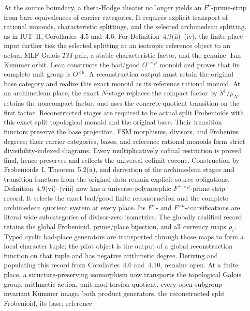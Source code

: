 \documentclass[11pt]{article}
\theoremstyle{plain}
\theoremstyle{definition}
\theoremstyle{remark}
\begin{document}
At the source boundary, a theta-Hodge theater no longer yields an
\(F^\vdash\)-prime-strip from bare equivalences of carrier categories.  It
requires explicit transport of rational monoids, characteristic splittings,
and the selected archimedean splitting, as in IUT~II, Corollaries~4.5 and~4.6.
For Definition~4.9(ii)--(iv), the finite-place input further ties the selected
splitting at an isotropic reference object to an actual MLF-Galois \(TM\)-pair,
a stable characteristic factor, and the genuine \(\operatorname{Ism}\) Kummer
orbit.  Lean constructs the bad/good \(O^{\square\times\mu}\) monoid and proves
that its complete unit group is \(O^{\times\mu}\).  A reconstruction output
must retain the original base category and realize this exact monoid as its
reference rational monoid.  At an archimedean place, the exact \(N\)-stage
replaces the compact factor by \(S^1/\mu_N\), retains the noncompact factor, and
uses the concrete quotient transition on the first factor.  Reconstructed
stages are required to be actual split Frobenioids with this exact split
topological monoid and the original base.  Their transition functors preserve
the base projection, FSM morphisms, divisors, and Frobenius degrees; their
carrier categories, bases, and reference rational monoids form strict
divisibility-indexed diagrams.
Every multiplicatively cofinal restriction is proved final, hence preserves
and reflects the universal colimit cocone.  Construction by Frobenioids~I,
Theorem~5.2(ii), and derivation of the archimedean stages and transition
functors from the original data remain explicit source obligations.
Definition~4.9(vi)--(viii) now has a universe-polymorphic
\(F^{\vdash\times\mu}\)-prime-strip record.  It selects the exact bad/good
finite reconstruction and the complete archimedean quotient system at every
place.  Its \(F^\times\)- and \(F^{\times\mu}\)-coarsifications are literal
wide subcategories of divisor-zero isometries.  The globally realified record
retains the global Frobenioid, prime/place bijection, and all currency maps
\(\rho_v\).  Typed cyclic bad-place generators are transported through those
maps to form a local character tuple; the pilot object is the output of a
global reconstruction function on that tuple and has negative arithmetic
degree.  Deriving and populating this record from Corollaries~4.6 and~4.10,
remains open.  At a finite place, a structure-preserving isomorphism now
transports the topological Galois group, arithmetic action,
unit-mod-torsion quotient, every open-subgroup invariant Kummer image, both
product generators, the reconstructed split Frobenioid, its base, reference
\end{document}
